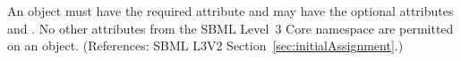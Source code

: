 An \InitialAssignment object must have the required attribute
 and may have the optional attributes   and
.  No other attributes from the SBML Level~3 Core namespace
are permitted on an \InitialAssignment object.  (References: SBML L3V2
Section~\ref{sec:initialAssignment}.)
